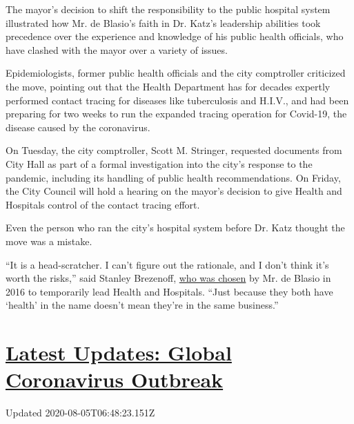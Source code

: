 The mayor's decision to shift the responsibility to the public hospital
system illustrated how Mr. de Blasio's faith in Dr. Katz's leadership
abilities took precedence over the experience and knowledge of his
public health officials, who have clashed with the mayor over a variety
of issues.

Epidemiologists, former public health officials and the city comptroller
criticized the move, pointing out that the Health Department has for
decades expertly performed contact tracing for diseases like
tuberculosis and H.I.V., and had been preparing for two weeks to run the
expanded tracing operation for Covid-19, the disease caused by the
coronavirus.

On Tuesday, the city comptroller, Scott M. Stringer, requested documents
from City Hall as part of a formal investigation into the city's
response to the pandemic, including its handling of public health
recommendations. On Friday, the City Council will hold a hearing on the
mayor's decision to give Health and Hospitals control of the contact
tracing effort.

Even the person who ran the city's hospital system before Dr. Katz
thought the move was a mistake.

``It is a head-scratcher. I can't figure out the rationale, and I don't
think it's worth the risks,'' said Stanley Brezenoff,
\href{https://www.nytimes3xbfgragh.onion/2016/11/08/nyregion/chief-of-new-yorks-struggling-public-hospital-system-is-resigning.html}{who
was chosen} by Mr. de Blasio in 2016 to temporarily lead Health and
Hospitals. ``Just because they both have `health' in the name doesn't
mean they're in the same business.''

\hypertarget{latest-updates-global-coronavirus-outbreak}{%
\section{\texorpdfstring{\href{https://www.nytimes3xbfgragh.onion/2020/08/04/world/coronavirus-cases.html?action=click\&pgtype=Article\&state=default\&region=MAIN_CONTENT_1\&context=storylines_live_updates}{Latest
Updates: Global Coronavirus
Outbreak}}{Latest Updates: Global Coronavirus Outbreak}}\label{latest-updates-global-coronavirus-outbreak}}

Updated 2020-08-05T06:48:23.151Z

